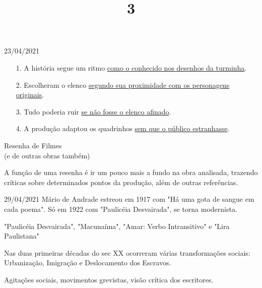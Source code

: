 \documentclass{SchoolBook}
\begin{document}
\begin{day}{23/04/2021}
        \begin{enumerate}[nosep]
                \item[1.]  A história segue um ritmo \underline{como o conhecido nos desenhos da turminha}.
                \item[2.]  Escolheram o elenco \underline{segundo sua proximidade com os personagens originais}.
                \item[3.]   Tudo poderia ruir \underline{se não fosse o elenco afinado}.
                \item[4.]   A produção adaptou os quadrinhos \underline{sem que o público estranhasse}.
        \end{enumerate}

        \title{3}{Resenha de Filmes\\(e de outras obras também)}

        A função de uma resenha é ir um pouco mais a fundo na obra analisada, trazendo críticas sobre determinados pontos da produção, além de outras referências.

    \end{day}
    
    \begin{day}{29/04/2021}
        Mário de Andrade estreou em 1917 com "Há uma gota de sangue em cada poema". Só em 1922 com "Paulicéia Desvairada", se torna modernista.
        
        "Paulicéia Desvairada", "Macunaíma", "Amar: Verbo Intransitivo" e "Lira Paulistana"
        
        Nas duas primeiras décadas do sec XX ocorreram várias transformações sociais: Urbanização, Imigração e Deslocamento dos Escravos.
        
        Agitações sociais, movimentos grevistas, visão crítica dos escritores.
    \end{day}
    
\end{document}
